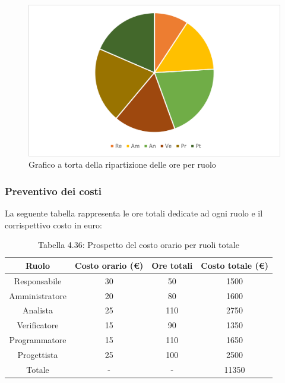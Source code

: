 \begin{figure}[H]
    \centering
    \includegraphics[scale=0.6]{img/grafi preventivo/torta/totale/totale.png}
    \caption{Grafico a torta della ripartizione delle ore per ruolo}
\end{figure}
\subsubsection{Preventivo dei costi}
La seguente tabella rappresenta le ore totali dedicate ad ogni ruolo e il corrispettivo costo in euro:
\begin{table}[h]
	\setlength\extrarowheight{5pt}
	\centering
	\begin{tabularx}{\textwidth}{|ccc|c|}
		\hline
		\rowcolor{white}
		\textbf{Ruolo} & \textbf{Costo orario (€)} & \textbf{Ore totali} & \textbf{Costo totale (€)} \\
		\hline
		Responsabile &30&50&1500 \\
		Amministratore &20&80&1600 \\
		Analista &25&110&2750 \\
		Verificatore &15&90&1350 \\
		Programmatore &15&110&1650 \\
		Progettista &25&100&2500 \\
		\hline
		Totale &-&-&11350 \\
		\hline
	\end{tabularx}
    \vspace{10pt}
	\caption{Tabella 4.36: Prospetto del costo orario per ruoli totale}
\end{table}
